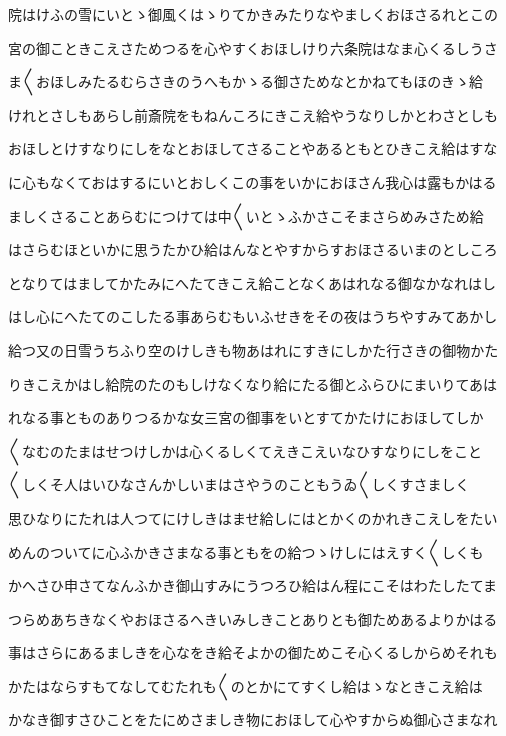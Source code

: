 \documentclass[a4paper,11pt,landscape]{ltjtarticle}
\begin{document}
院はけふの雪にいとゝ御風くはゝりてかきみたりなやましくおほさるれとこの
\par\medskip
宮の御こときこえさためつるを心やすくおほしけり六条院はなま心くるしうさ
\par\medskip
ま〱おほしみたるむらさきのうへもかゝる御さためなとかねてもほのきゝ給
\par\medskip
けれとさしもあらし前斎院をもねんころにきこえ給やうなりしかとわさとしも
\par\medskip
おほしとけすなりにしをなとおほしてさることやあるともとひきこえ給はすな
\par\medskip
に心もなくておはするにいとおしくこの事をいかにおほさん我心は露もかはる
\par\medskip
ましくさることあらむにつけては中〱いとゝふかさこそまさらめみさため給
\par\medskip
はさらむほといかに思うたかひ給はんなとやすからすおほさるいまのとしころ
\par\medskip
となりてはましてかたみにへたてきこえ給ことなくあはれなる御なかなれはし
\par\medskip
はし心にへたてのこしたる事あらむもいふせきをその夜はうちやすみてあかし
\par\medskip
給つ又の日雪うちふり空のけしきも物あはれにすきにしかた行さきの御物かた
\par\medskip
りきこえかはし給院のたのもしけなくなり給にたる御とふらひにまいりてあは
\par\medskip
れなる事とものありつるかな女三宮の御事をいとすてかたけにおほしてしか
\par\medskip
〱なむのたまはせつけしかは心くるしくてえきこえいなひすなりにしをこと
\par\medskip
〱しくそ人はいひなさんかしいまはさやうのこともうゐ〱しくすさましく
\par\medskip
思ひなりにたれは人つてにけしきはませ給しにはとかくのかれきこえしをたい
\par\medskip
めんのついてに心ふかきさまなる事ともをの給つゝけしにはえすく〱しくも
\par\medskip
かへさひ申さてなんふかき御山すみにうつろひ給はん程にこそはわたしたてま
\par\medskip
つらめあちきなくやおほさるへきいみしきことありとも御ためあるよりかはる
\par\medskip
事はさらにあるましきを心なをき給そよかの御ためこそ心くるしからめそれも
\par\medskip
かたはならすもてなしてむたれも〱のとかにてすくし給はゝなときこえ給は
\par\medskip
かなき御すさひことをたにめさましき物におほして心やすからぬ御心さまなれ
\end{document}
